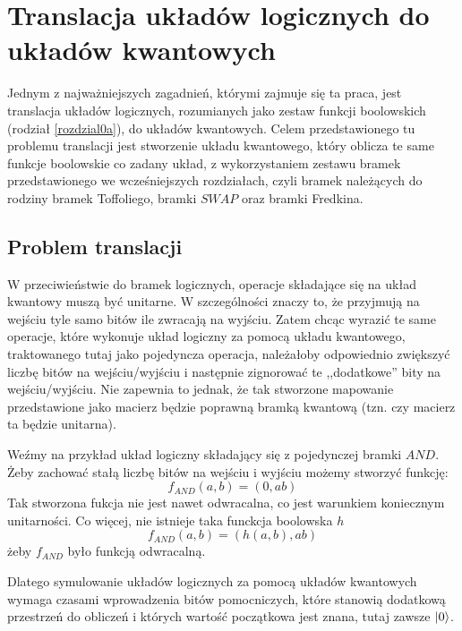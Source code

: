 \chapter{Translacja układów logicznych do układów kwantowych}
\thispagestyle{chapterBeginStyle}
\label{rozdzial2a}
Jednym z najważniejszych zagadnień, którymi zajmuje się ta praca, jest translacja układów logicznych, rozumianych jako zestaw funkcji boolowskich (rodział \ref{rozdzial0a}), do układów kwantowych. Celem przedstawionego tu problemu translacji jest stworzenie układu kwantowego, który oblicza te same funkcje boolowskie co zadany układ, z wykorzystaniem zestawu bramek przedstawionego we wcześniejszych rozdziałach, czyli bramek należących do rodziny bramek Toffoliego, bramki $SWAP$ oraz bramki Fredkina. 
\section{Problem translacji}
W przeciwieństwie do bramek logicznych, operacje składające się na układ kwantowy muszą być unitarne. W szczególności znaczy to, że przyjmują na wejściu tyle samo bitów ile zwracają na wyjściu. Zatem chcąc wyrazić te same operacje, które wykonuje układ logiczny za pomocą układu kwantowego, traktowanego tutaj jako pojedyncza operacja, należałoby odpowiednio zwiększyć liczbę bitów na wejściu/wyjściu i następnie zignorować te ,,dodatkowe'' bity na wejściu/wyjściu. Nie zapewnia to jednak, że tak stworzone mapowanie przedstawione jako macierz będzie poprawną bramką kwantową (tzn. czy macierz ta będzie unitarna).
\par Weźmy na przykład układ logiczny składający się z pojedynczej bramki $AND$. Żeby zachować stałą liczbę bitów na wejściu i wyjściu możemy stworzyć funkcję:
\[f_{AND}(a,b) = (0, ab)\]
Tak stworzona fukcja nie jest nawet odwracalna, co jest warunkiem koniecznym unitarności. Co więcej, nie istnieje taka funckcja boolowska $h$
\[f_{AND}(a,b) = (h(a,b), ab)\]
żeby $f_{AND}$ było funkcją odwracalną.
\par Dlatego symulowanie układów logicznych za pomocą układów kwantowych wymaga czasami wprowadzenia bitów pomocniczych, które stanowią dodatkową przestrzeń do obliczeń i których wartość początkowa jest znana, tutaj zawsze $\ket{0}$.
